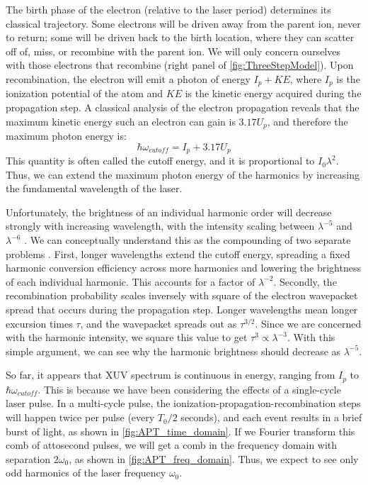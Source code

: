 The birth phase of the electron (relative to the laser period) determines its classical trajectory. Some electrons will be driven away from the parent ion, never to return; some will be driven back to the birth location, where they can scatter off of, miss, or recombine with the parent ion. We will only concern ourselves with those electrons that recombine (right panel of \cref{fig:ThreeStepModel}). Upon recombination, the electron will emit a photon of energy $I_p + KE$, where $I_p$ is the ionization potential of the atom and $KE$ is the kinetic energy acquired during the propagation step. A classical analysis of the electron propagation reveals that the maximum kinetic energy such an electron can gain is $3.17 U_p$, and therefore the maximum photon energy is: 
\begin{equation}
\hbar \omega_{cutoff} = I_p + 3.17 U_p
\label{eqn:cutoff_energy}
\end{equation}
This quantity is often called the cutoff energy, and it is proportional to $I_0 \lambda^2$. Thus, we can extend the maximum photon energy of the harmonics by increasing the fundamental wavelength of the laser.

Unfortunately, the brightness of an individual harmonic order will decrease strongly with increasing wavelength, with the intensity scaling between $\lambda^{-5}$ and $\lambda^{-6}$ \cite{tateScalingWavePacketDynamics2007,shinerWavelengthScalingHigh2009}. We can conceptually understand this as the compounding of two separate problems \cite{lewensteinTheoryHighharmonicGeneration1994}. First, longer wavelengths extend the cutoff energy, spreading a fixed harmonic conversion efficiency across more harmonics and lowering the brightness of each individual harmonic. This accounts for a factor of $\lambda^{-2}$. Secondly, the recombination probability scales inversely with square of the electron wavepacket spread that occurs during the propagation step. Longer wavelengths mean longer excursion times $\tau$, and the wavepacket spreads out as $\tau^{3/2}$. Since we are concerned with the harmonic intensity, we square this value to get $\tau^3 \propto \lambda^{-3}$. With this simple argument, we can see why the harmonic brightness should decrease as $\lambda^{-5}$.

So far, it appears that XUV spectrum is continuous in energy, ranging from $I_p$ to $\hbar \omega_{cutoff}$. This is because we have been considering the effects of a single-cycle laser pulse. In a multi-cycle pulse, the ionization-propagation-recombination steps will happen twice per pulse (every $T_0/2$ seconds), and each event results in a brief burst of light, as shown in \cref{fig:APT_time_domain}. If we Fourier transform this comb of attosecond pulses, we will get a comb in the frequency domain with separation $2 \omega_0$, as shown in \cref{fig:APT_freq_domain}. Thus, we expect to see only odd harmonics of the laser frequency $\omega_0$.

